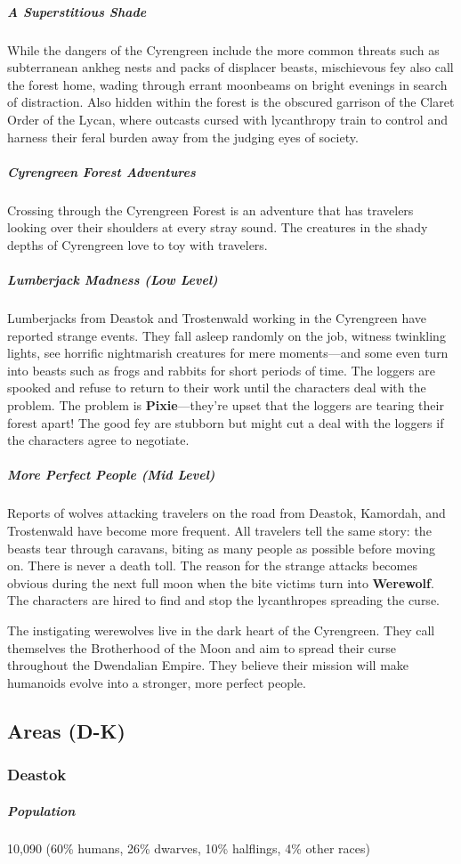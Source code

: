\documentclass[10pt,a4paper,twoside,bg=print,twocolumn,openany,nodeprecatedcode]{dndbook}
\begin{document}
\subparagraph{A Superstitious Shade}
While the dangers of the Cyrengreen include the more common threats such as subterranean ankheg nests and packs of displacer beasts, mischievous fey also call the forest home, wading through errant moonbeams on bright evenings in search of distraction. Also hidden within the forest is the obscured garrison of the Claret Order of the Lycan, where outcasts cursed with lycanthropy train to control and harness their feral burden away from the judging eyes of society.

\subparagraph{Cyrengreen Forest Adventures}
Crossing through the Cyrengreen Forest is an adventure that has travelers looking over their shoulders at every stray sound. The creatures in the shady depths of Cyrengreen love to toy with travelers.

\subparagraph{Lumberjack Madness (Low Level)}
Lumberjacks from Deastok and Trostenwald working in the Cyrengreen have reported strange events. They fall asleep randomly on the job, witness twinkling lights, see horrific nightmarish creatures for mere moments—and some even turn into beasts such as frogs and rabbits for short periods of time. The loggers are spooked and refuse to return to their work until the characters deal with the problem. The problem is \textbf{Pixie}—they're upset that the loggers are tearing their forest apart! The good fey are stubborn but might cut a deal with the loggers if the characters agree to negotiate.

\subparagraph{More Perfect People (Mid Level)}
Reports of wolves attacking travelers on the road from Deastok, Kamordah, and Trostenwald have become more frequent. All travelers tell the same story: the beasts tear through caravans, biting as many people as possible before moving on. There is never a death toll. The reason for the strange attacks becomes obvious during the next full moon when the bite victims turn into \textbf{Werewolf}. The characters are hired to find and stop the lycanthropes spreading the curse.

The instigating werewolves live in the dark heart of the Cyrengreen. They call themselves the Brotherhood of the Moon and aim to spread their curse throughout the Dwendalian Empire. They believe their mission will make humanoids evolve into a stronger, more perfect people.

\subsection{Areas (D-K)}
\subsubsection{Deastok}
\subparagraph{Population}
10,090 (60\% humans, 26\% dwarves, 10\% halflings, 4\% other races)
\end{document}

